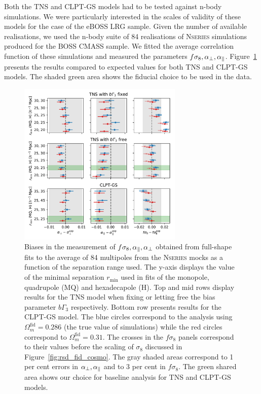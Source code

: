 Both the TNS and CLPT-GS models had to be tested against n-body simulations. 
We were particularly interested in the scales of validity of these models 
for the case of the eBOSS LRG sample. Given the number of available realisations, 
we used the n-body suite of 84 realisations of \textsc{Nseries} simulations 
produced for the BOSS CMASS sample. We fitted the average correlation function 
of these simulations and measured the parameters $f\sigma_8, {\alpha_\perp}, {\alpha_\parallel}$. 
Figure~\ref{fig:rsd_bias_mocks} presents the results compared to expected values 
for both TNS and CLPT-GS models. The shaded green area shows the fiducial choice 
to be used in the data. 

\begin{figure}
    \centering 
    \includegraphics[width=0.7\textwidth]{fig/galaxies/rsd_rmin_nseries.pdf}
    \caption{Biases in the measurement of $f\sigma_8, {\alpha_\parallel}, {\alpha_\perp}$ obtained 
    from full-shape fits to the average of 84 multipoles from the \textsc{Nseries} 
    mocks as a function of the separation range used. 
    The y-axis displays the value of the minimal separation $r_\text{min}$ 
    used in fits of the monopole, quadrupole (MQ) and hexadecapole (H). 
    Top and mid rows display results for the TNS model when fixing or letting free 
    the bias parameter $b\Gamma_3$ respectively. 
    Bottom row presents results for the CLPT-GS model. 
    The blue circles correspond to the analysis using $\Omega_m^\text{fid} = 0.286$ 
    (the true value of simulations) while the red circles correspond to 
    $\Omega_m^\text{fid} = 0.31$. The crosses in the $f\sigma_8$ panels correspond 
    to their values before the scaling of $\sigma_8$ discussed in Figure~\ref{fig:rsd_fid_cosmo}. 
    The gray shaded areas correspond to 1 per cent errors in ${\alpha_\perp}, {\alpha_\parallel}$ and 
    to 3 per cent in $f\sigma_8$. 
    The green shared area shows our choice for baseline analysis for TNS and CLPT-GS models.}
    \label{fig:rsd_bias_mocks}
\end{figure}

